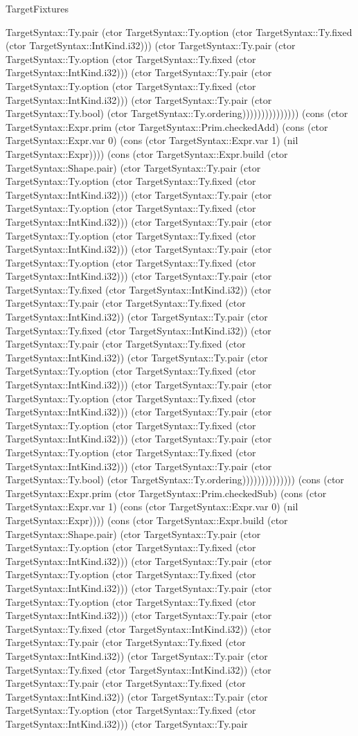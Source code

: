 \begin{lexlean}{TargetFixtures}
\begin{semanticmodule}
{TargetSyntax::Ty.pair (ctor TargetSyntax::Ty.option (ctor TargetSyntax::Ty.fixed (ctor TargetSyntax::IntKind.i32))) (ctor TargetSyntax::Ty.pair (ctor TargetSyntax::Ty.option (ctor TargetSyntax::Ty.fixed (ctor TargetSyntax::IntKind.i32))) (ctor TargetSyntax::Ty.pair (ctor TargetSyntax::Ty.option (ctor TargetSyntax::Ty.fixed (ctor TargetSyntax::IntKind.i32))) (ctor TargetSyntax::Ty.pair (ctor TargetSyntax::Ty.bool) (ctor TargetSyntax::Ty.ordering))))))))))))))) (cons (ctor TargetSyntax::Expr.prim (ctor TargetSyntax::Prim.checkedAdd) (cons (ctor TargetSyntax::Expr.var 0) (cons (ctor TargetSyntax::Expr.var 1) (nil TargetSyntax::Expr)))) (cons (ctor TargetSyntax::Expr.build (ctor TargetSyntax::Shape.pair) (ctor TargetSyntax::Ty.pair (ctor TargetSyntax::Ty.option (ctor TargetSyntax::Ty.fixed (ctor TargetSyntax::IntKind.i32))) (ctor TargetSyntax::Ty.pair (ctor TargetSyntax::Ty.option (ctor TargetSyntax::Ty.fixed (ctor TargetSyntax::IntKind.i32))) (ctor TargetSyntax::Ty.pair (ctor TargetSyntax::Ty.option (ctor TargetSyntax::Ty.fixed (ctor TargetSyntax::IntKind.i32))) (ctor TargetSyntax::Ty.pair (ctor TargetSyntax::Ty.option (ctor TargetSyntax::Ty.fixed (ctor TargetSyntax::IntKind.i32))) (ctor TargetSyntax::Ty.pair (ctor TargetSyntax::Ty.fixed (ctor TargetSyntax::IntKind.i32)) (ctor TargetSyntax::Ty.pair (ctor TargetSyntax::Ty.fixed (ctor TargetSyntax::IntKind.i32)) (ctor TargetSyntax::Ty.pair (ctor TargetSyntax::Ty.fixed (ctor TargetSyntax::IntKind.i32)) (ctor TargetSyntax::Ty.pair (ctor TargetSyntax::Ty.fixed (ctor TargetSyntax::IntKind.i32)) (ctor TargetSyntax::Ty.pair (ctor TargetSyntax::Ty.option (ctor TargetSyntax::Ty.fixed (ctor TargetSyntax::IntKind.i32))) (ctor TargetSyntax::Ty.pair (ctor TargetSyntax::Ty.option (ctor TargetSyntax::Ty.fixed (ctor TargetSyntax::IntKind.i32))) (ctor TargetSyntax::Ty.pair (ctor TargetSyntax::Ty.option (ctor TargetSyntax::Ty.fixed (ctor TargetSyntax::IntKind.i32))) (ctor TargetSyntax::Ty.pair (ctor TargetSyntax::Ty.option (ctor TargetSyntax::Ty.fixed (ctor TargetSyntax::IntKind.i32))) (ctor TargetSyntax::Ty.pair (ctor TargetSyntax::Ty.bool) (ctor TargetSyntax::Ty.ordering)))))))))))))) (cons (ctor TargetSyntax::Expr.prim (ctor TargetSyntax::Prim.checkedSub) (cons (ctor TargetSyntax::Expr.var 1) (cons (ctor TargetSyntax::Expr.var 0) (nil TargetSyntax::Expr)))) (cons (ctor TargetSyntax::Expr.build (ctor TargetSyntax::Shape.pair) (ctor TargetSyntax::Ty.pair (ctor TargetSyntax::Ty.option (ctor TargetSyntax::Ty.fixed (ctor TargetSyntax::IntKind.i32))) (ctor TargetSyntax::Ty.pair (ctor TargetSyntax::Ty.option (ctor TargetSyntax::Ty.fixed (ctor TargetSyntax::IntKind.i32))) (ctor TargetSyntax::Ty.pair (ctor TargetSyntax::Ty.option (ctor TargetSyntax::Ty.fixed (ctor TargetSyntax::IntKind.i32))) (ctor TargetSyntax::Ty.pair (ctor TargetSyntax::Ty.fixed (ctor TargetSyntax::IntKind.i32)) (ctor TargetSyntax::Ty.pair (ctor TargetSyntax::Ty.fixed (ctor TargetSyntax::IntKind.i32)) (ctor TargetSyntax::Ty.pair (ctor TargetSyntax::Ty.fixed (ctor TargetSyntax::IntKind.i32)) (ctor TargetSyntax::Ty.pair (ctor TargetSyntax::Ty.fixed (ctor TargetSyntax::IntKind.i32)) (ctor TargetSyntax::Ty.pair (ctor TargetSyntax::Ty.option (ctor TargetSyntax::Ty.fixed (ctor TargetSyntax::IntKind.i32))) (ctor TargetSyntax::Ty.pair }
\end{semanticmodule}
\end{lexlean}
